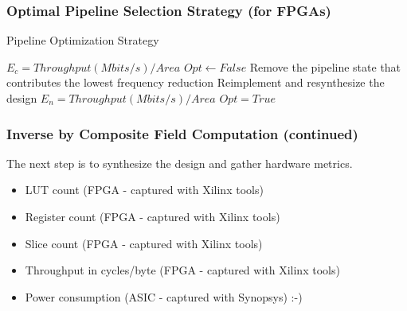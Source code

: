 \documentclass[handout]{beamer}
\begin{document}
\begin{frame}[fragile]
	\frametitle{Optimal Pipeline Selection Strategy (for FPGAs)}
\begin{algorithm}[H] 
\caption{Pipeline Optimization Strategy} 
\begin{algorithmic}[1]
\State $E_c = Throughput(Mbits/s)/Area$
\State $Opt \gets False$
	\State Remove the pipeline state that contributes the lowest frequency reduction
	\State Reimplement and resynthesize the design
	\State $E_n = Throughput(Mbits/s)/Area$
		\State $Opt = True$
	\EndIf
\EndWhile
\end{algorithmic}
\end{algorithm}
\end{frame}

\begin{frame}
	\frametitle{Inverse by Composite Field Computation (continued)}
	The next step is to synthesize the design and gather hardware metrics. 
	\begin{itemize}
		\item LUT count (FPGA - captured with Xilinx tools)
		\item Register count (FPGA - captured with Xilinx tools)
		\item Slice count (FPGA - captured with Xilinx tools)
		\item Throughput in cycles/byte (FPGA - captured with Xilinx tools)
		\item Power consumption (ASIC - captured with Synopsys) :-)
	\end{itemize}
\end{frame}


\end{document}

